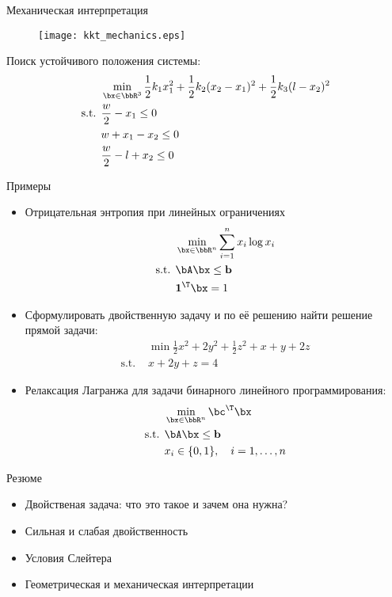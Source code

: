 \documentclass[12pt]{beamer}
\begin{document}
\begin{frame}{Механическая интерпретация}
\begin{figure}
\centering
\texttt{[image: kkt\_mechanics.eps]}
\end{figure}
Поиск устойчивого положения системы:
\begin{equation*}
\begin{split}
& \min_{\bx \in \bbR^3} \frac{1}{2}k_1x_1^2 + \frac{1}{2}k_2(x_2 - x_1)^2 + \frac{1}{2}k_3 (l - x_2)^2\\
\text{s.t. } & \frac{w}{2} - x_1 \leq 0\\
& w + x_1 - x_2 \leq 0\\
& \frac{w}{2} - l + x_2 \leq 0
\end{split}
\end{equation*}

\end{frame}

\begin{frame}{Примеры}
\footnotesize
\begin{itemize}
\item Отрицательная энтропия при линейных ограничениях
\vspace{-3mm}
\begin{equation*}
\begin{split}
& \min\limits_{\bx \in \bbR^n} \sum\limits_{i=1}^n x_i \log x_i\\
\text{s.t. } & \bA\bx \leq \mathbf{b}\\
& \mathbf{1}^{\T}\bx = 1
\end{split}
\end{equation*} 
\item Сформулировать двойственную задачу и по её решению найти решение прямой задачи:
\begin{equation*}
\begin{split}
& \min \frac{1}{2}x^2 + 2y^2 + \frac{1}{2}z^2 + x + y + 2z\\
\text{s.t. } & x+2y+z = 4
\end{split}
\end{equation*}
\item Релаксация Лагранжа для задачи бинарного линейного программирования:
\begin{equation*}
\begin{split}
&\min\limits_{\bx \in \bbR^n} \bc^{\T}\bx\\
\text{s.t. } & \bA \bx \leq \mathbf{b}\\
& x_i \in \{0,1 \}, \quad i = 1,\ldots,n
\end{split}
\end{equation*}
\end{itemize}
\end{frame}

\begin{frame}{Резюме}
\begin{itemize}
\item Двойственая задача: что это такое и зачем она нужна?
\item Сильная и слабая двойственность
\item Условия Слейтера
\item Геометрическая и механическая интерпретации
\end{itemize}
\end{frame}
\end{document}
